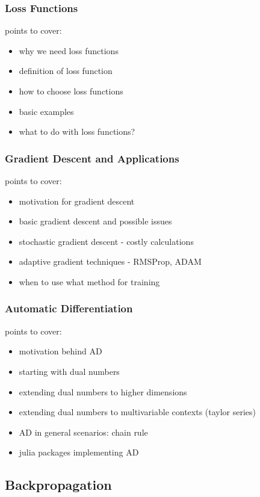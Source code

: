 \documentclass[a4paper,11pt, titlepage]{article}
\theoremstyle{definition}
\theoremstyle{plain}
\theoremstyle{remark}
\begin{document}
\subsubsection{Loss Functions}
points to cover:
\begin{itemize}
    \item why we need loss functions
    \item definition of loss function
    \item how to choose loss functions
    \item basic examples
    \item what to do with loss functions?
\end{itemize}

\subsubsection{Gradient Descent and Applications}
points to cover:
\begin{itemize}
    \item motivation for gradient descent
    \item basic gradient descent and possible issues
    \item stochastic gradient descent - costly calculations
    \item adaptive gradient techniques - RMSProp, ADAM
    \item when to use what method for training
\end{itemize}

\subsubsection{Automatic Differentiation}
points to cover:
\begin{itemize}
    \item motivation behind AD
    \item starting with dual numbers
    \item extending dual numbers to higher dimensions
    \item extending dual numbers to multivariable contexts (taylor series)
    \item AD in general scenarios: chain rule
    \item julia packages implementing AD
\end{itemize}

\subsection{Backpropagation}
\end{document}
